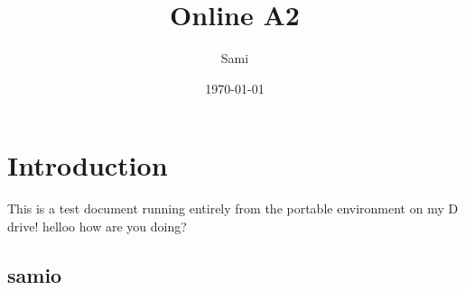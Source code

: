 \documentclass{article}
\title{Online A2}
\author{Sami}
\date{\today}
\begin{document}
\maketitle

\section{Introduction}
This is a test document running entirely from the portable environment on my D drive!
helloo how are you doing?
\subsection{samio}
\end{document}
